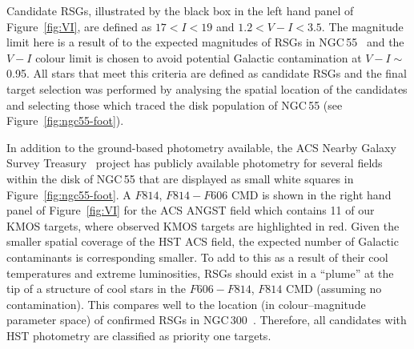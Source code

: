 Candidate RSGs, illustrated by the black box in the left hand panel of Figure~\ref{fig:VI}, are defined as $17 < I < 19$ and $1.2 < V-I < 3.5$.
The magnitude limit here is a result of to the expected magnitudes of RSGs in NGC\,55~\citep[e.g.][who identified RSGs in NGC\,300]{2015ApJ...805..182G} and the $V-I$ colour limit is chosen to avoid potential Galactic contamination at $V-I\sim$ 0.95.
All stars that meet this criteria are defined as candidate RSGs and the final target selection was performed by analysing the spatial location of the candidates and selecting those which traced the disk population of NGC\,55 (see Figure~\ref{fig:ngc55-foot}).

In addition to the ground-based photometry available, the ACS Nearby Galaxy Survey Treasury~\citep[ANGST][]{2009ApJS..183...67D} project has publicly available photometry for several fields within the disk of NGC\,55 that are displayed as small white squares in Figure~\ref{fig:ngc55-foot}.
A $F814$, $F814-F606$ CMD is shown in the right hand panel of Figure~\ref{fig:VI} for the ACS ANGST field which contains 11 of our KMOS targets, where observed KMOS targets are highlighted in red.
Given the smaller spatial coverage of the HST ACS field, the expected number of Galactic contaminants is corresponding smaller.
To add to this as a result of their cool temperatures and extreme luminosities, RSGs should exist in a ``plume'' at the tip of a structure of cool stars in the $F606-F814$, $F814$ CMD (assuming no contamination).
This compares well to the location (in colour--magnitude parameter space) of confirmed RSGs in NGC\,300~\citep{2015ApJ...805..182G}.
Therefore, all candidates with HST photometry are classified as priority one targets.






